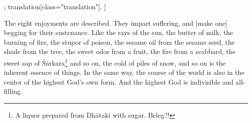 \begin{alignment}[
  texts=edition[class="edition"];
  translation[class="translation"],
  ]
\begin{translation}
\begin{tlate}
The eight enjoyments are described. They impart suffering, and [make one] begging for their sustenance.\textsuperscript{\coro{[\lowroman{25}]}}
Like the rays of the sun, the butter of milk, the burning of fire, the stupor of poison, the sesame oil from the sesame seed, the shade from the tree, the sweet odor from a fruit, the fire from a scabbard, the sweet sap of Śārkara\footnote{A liquor prepared from Dhātakī with sugar. Beleg?!} and so on, the cold of piles of snow, and so on is the inherent essence of things. In the same way, the course of the world is also in the center of the highest God's own form. And the highest God is indivisible and all-filling.\textsuperscript{\coro{[\lowroman{30}]}}
    \end{tlate}
  \end{translation}
\end{alignment}
\ekdpb*{}
